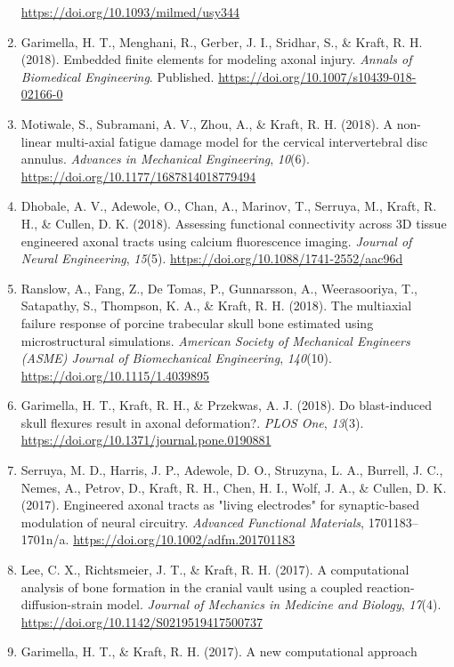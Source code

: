 \documentclass[
]{article}
\begin{document}
\begin{enumerate}
  \url{https://doi.org/10.1093/milmed/usy344}
\item
  Garimella, H. T., Menghani, R., Gerber, J. I., Sridhar, S., \& Kraft,
  R. H. (2018). Embedded finite elements for modeling axonal injury.
  \emph{Annals of Biomedical Engineering}. Published.
  \url{https://doi.org/10.1007/s10439-018-02166-0}
\item
  Motiwale, S., Subramani, A. V., Zhou, A., \& Kraft, R. H. (2018). A
  non-linear multi-axial fatigue damage model for the cervical
  intervertebral disc annulus. \emph{Advances in Mechanical
  Engineering}, \emph{10}(6).
  \url{https://doi.org/10.1177/1687814018779494}
\item
  Dhobale, A. V., Adewole, O., Chan, A., Marinov, T., Serruya, M.,
  Kraft, R. H., \& Cullen, D. K. (2018). Assessing functional
  connectivity across 3D tissue engineered axonal tracts using calcium
  fluorescence imaging. \emph{Journal of Neural Engineering},
  \emph{15}(5). \url{https://doi.org/10.1088/1741-2552/aac96d}
\item
  Ranslow, A., Fang, Z., De Tomas, P., Gunnarsson, A., Weerasooriya, T.,
  Satapathy, S., Thompson, K. A., \& Kraft, R. H. (2018). The multiaxial
  failure response of porcine trabecular skull bone estimated using
  microstructural simulations. \emph{American Society of Mechanical
  Engineers (ASME) Journal of Biomechanical Engineering},
  \emph{140}(10). \url{https://doi.org/10.1115/1.4039895}
\item
  Garimella, H. T., Kraft, R. H., \& Przekwas, A. J. (2018). Do
  blast-induced skull flexures result in axonal deformation?. \emph{PLOS
  One}, \emph{13}(3). \url{https://doi.org/10.1371/journal.pone.0190881}
\item
  Serruya, M. D., Harris, J. P., Adewole, D. O., Struzyna, L. A.,
  Burrell, J. C., Nemes, A., Petrov, D., Kraft, R. H., Chen, H. I.,
  Wolf, J. A., \& Cullen, D. K. (2017). Engineered axonal tracts as
  "living electrodes" for synaptic-based modulation of neural circuitry.
  \emph{Advanced Functional Materials}, 1701183--1701n/a.
  \url{https://doi.org/10.1002/adfm.201701183}
\item
  Lee, C. X., Richtsmeier, J. T., \& Kraft, R. H. (2017). A
  computational analysis of bone formation in the cranial vault using a
  coupled reaction-diffusion-strain model. \emph{Journal of Mechanics in
  Medicine and Biology}, \emph{17}(4).
  \url{https://doi.org/10.1142/S0219519417500737}
\item
  Garimella, H. T., \& Kraft, R. H. (2017). A new computational approach

\end{enumerate}
\end{document}

